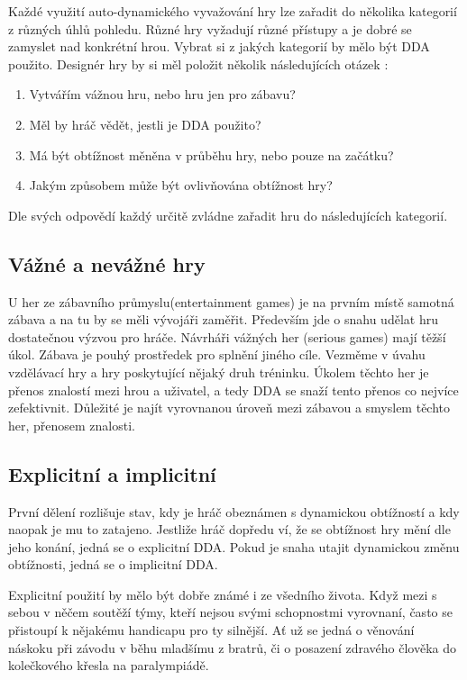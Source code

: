 Každé využití auto-dynamického vyvažování hry lze zařadit do několika kategorií z různých úhlů pohledu. Různé hry vyžadují různé přístupy a je dobré se zamyslet nad konkrétní hrou. Vybrat si z jakých kategorií by mělo být DDA použito. Designér hry by si měl položit několik následujících otázek :

\begin{enumerate}
  \item Vytvářím vážnou hru, nebo hru jen pro zábavu?
	\item Měl by hráč vědět, jestli je DDA použito?
	\item Má být obtížnost měněna v průběhu hry, nebo pouze na začátku?
	\item Jakým způsobem může být ovlivňována obtížnost hry?
\end{enumerate}

Dle svých odpovědí každý určitě zvládne zařadit hru do následujících kategorií.

\subsection{Vážné a nevážné hry}

U her ze zábavního průmyslu(entertainment games) je na prvním místě samotná zábava a na tu by se měli vývojáři zaměřit. Především jde o snahu udělat hru dostatečnou výzvou pro hráče. Návrháři vážných her (serious games) mají těžší úkol. Zábava je pouhý prostředek pro splnění jiného cíle. Vezměme v úvahu vzdělávací hry a hry poskytující nějaký druh tréninku. Úkolem těchto her je přenos znalostí mezi hrou a uživatel, a tedy DDA se snaží tento přenos co nejvíce zefektivnit. Důležité je najít vyrovnanou úroveň mezi zábavou a smyslem těchto her, přenosem znalosti. \cite{16Survey}

\subsection{Explicitní a implicitní}

První dělení rozlišuje stav, kdy je hráč obeznámen s dynamickou obtížností a kdy naopak je mu to zatajeno. Jestliže hráč dopředu ví, že se obtížnost hry mění dle jeho konání, jedná se o explicitní DDA. Pokud je snaha utajit dynamickou změnu obtížnosti, jedná se o implicitní DDA.

Explicitní použití by mělo být dobře známé i ze všedního života. Když mezi s sebou v něčem soutěží týmy, kteří nejsou svými schopnostmi vyrovnaní, často se přistoupí k nějakému handicapu pro ty silnější. Ať už se jedná o věnování náskoku při závodu v běhu mladšímu z bratrů, či o posazení zdravého člověka do kolečkového křesla na paralympiádě. 

